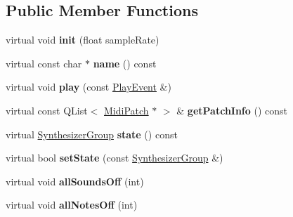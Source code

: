 \subsection*{Public Member Functions}
\begin{DoxyCompactItemize}
\item 
\mbox{\label{class_fluid_s_1_1_fluid_a8febaf7107004c0a418610e453dbd7e1}} 
virtual void {\bfseries init} (float sample\+Rate)
\item 
\mbox{\label{class_fluid_s_1_1_fluid_af48b857c7243e2165b262848e4ef58ce}} 
virtual const char $\ast$ {\bfseries name} () const
\item 
\mbox{\label{class_fluid_s_1_1_fluid_af6e4c1c56a9d4614bf2ae142a8280ef2}} 
virtual void {\bfseries play} (const \hyperlink{class_ms_1_1_play_event}{Play\+Event} \&)
\item 
\mbox{\label{class_fluid_s_1_1_fluid_ab6f123c14590b0de67bd7bb35171f3dd}} 
virtual const Q\+List$<$ \hyperlink{struct_ms_1_1_midi_patch}{Midi\+Patch} $\ast$ $>$ \& {\bfseries get\+Patch\+Info} () const
\item 
\mbox{\label{class_fluid_s_1_1_fluid_a0d034484be8e27f2ed03637285a8c1c7}} 
virtual \hyperlink{class_ms_1_1_synthesizer_group}{Synthesizer\+Group} {\bfseries state} () const
\item 
\mbox{\label{class_fluid_s_1_1_fluid_a543672b744cd6d3f28cf7dd6848e3eeb}} 
virtual bool {\bfseries set\+State} (const \hyperlink{class_ms_1_1_synthesizer_group}{Synthesizer\+Group} \&)
\item 
\mbox{\label{class_fluid_s_1_1_fluid_ae69af3c42010de709d5be96927325e2a}} 
virtual void {\bfseries all\+Sounds\+Off} (int)
\item 
\mbox{\label{class_fluid_s_1_1_fluid_a48cc85999097abdd9e954843c9329a08}} 
virtual void {\bfseries all\+Notes\+Off} (int)
\item 
\mbox{\label{class_fluid_s_1_1_fluid_af9523be2eca05a6eae4cd9802ed45f2d}} 

\end{DoxyCompactItemize}
